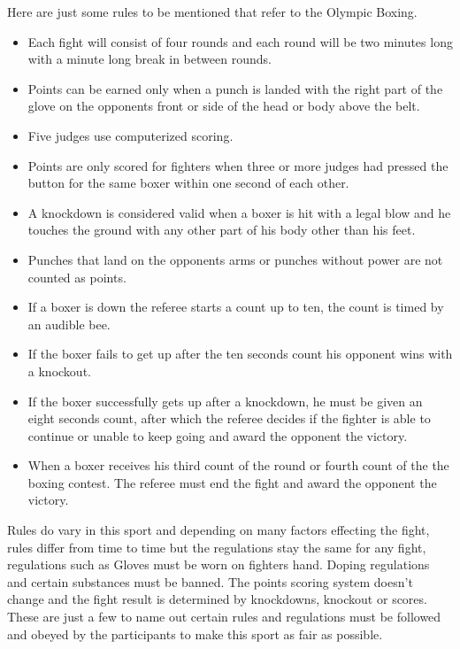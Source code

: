 \documentclass[a4paper,12pt,twoside]{report}
\begin{document}
Here are just some rules to be mentioned that refer to the Olympic Boxing.
\begin{itemize}
    \item Each fight will consist of four rounds and each round will be two minutes long with a minute long break in between rounds.
    \item Points can be earned only when a punch is landed with the right part of the glove on the opponents front or side of the head or body above the belt.
    \item Five judges use computerized scoring.
    \item Points are only scored for fighters when three or more judges had pressed the button for the same boxer within one second of each other.
    \item A knockdown is considered valid when a boxer is hit with a legal blow and he touches the ground with any other part of his body other than his feet.
    \item Punches  that land on the opponents arms or punches without power are not counted as points.
    \item If a boxer is down the referee starts a count up to ten, the count is timed by an audible bee.
    \item If the boxer fails to get up after the ten seconds count his opponent wins with a knockout.
    \item If the boxer successfully gets up after a knockdown, he must be given an eight seconds count, after which the referee decides if the fighter is able to continue or unable to keep going and award the opponent the victory.
    \item When a boxer receives his third count of the round or fourth count of the the boxing contest. The referee must end the fight and award the opponent the victory.
\end{itemize}
\cite{lewandowski2012olympic}

Rules do vary in this sport and depending on many factors effecting the fight, rules differ from time to time but the regulations stay the same for any fight, regulations such as
Gloves must be worn on fighters hand.
Doping regulations and certain substances must be banned.
The points scoring system doesn't change and the fight result is determined by knockdowns, knockout or scores.
These are just a few to name out certain rules and regulations must be followed and obeyed by the participants to make this sport as fair as possible. 
\end{document}
